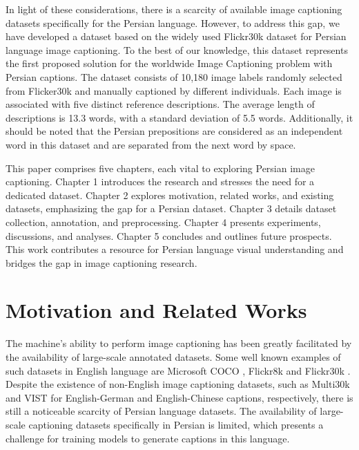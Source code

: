 \documentclass[runningheads]{llncs}
\begin{document}
In light of these considerations, there is a scarcity of available image captioning datasets specifically for the Persian language. However, to address this gap, we have developed a dataset based on the widely used Flickr30k dataset \cite{Flickr30k} for Persian language image captioning. To the best of our knowledge, this dataset represents the first proposed solution for the worldwide Image Captioning problem with Persian captions. The dataset consists of 10,180 image labels randomly selected from Flicker30k and manually captioned by different individuals. Each image is associated with five distinct reference descriptions. The average length of descriptions is 13.3 words, with a standard deviation of 5.5 words. Additionally, it should be noted that the Persian prepositions are considered as an independent word in this dataset and are separated from the next word by space.

This paper comprises five chapters, each vital to exploring Persian image captioning. Chapter 1 introduces the research and stresses the need for a dedicated dataset. Chapter 2 explores motivation, related works, and existing datasets, emphasizing the gap for a Persian dataset. Chapter 3 details dataset collection, annotation, and preprocessing. Chapter 4 presents experiments, discussions, and analyses. Chapter 5 concludes and outlines future prospects. This work contributes a resource for Persian language visual understanding and bridges the gap in image captioning research.

\section{Motivation and Related Works}
The machine's ability to perform image captioning has been greatly facilitated by the availability of large-scale annotated datasets. Some well known examples of such datasets in English language are Microsoft COCO \cite{MSCOCO}, Flickr8k \cite{Flickr8k} and Flickr30k \cite{Flickr30k}. Despite the existence of non-English image captioning datasets, such as Multi30k \cite{Multi30k} and VIST \cite{VIST} for English-German and English-Chinese captions, respectively, there is still a noticeable scarcity of Persian language datasets. The availability of large-scale captioning datasets specifically in Persian is limited, which presents a challenge for training models to generate captions in this language.
\end{document}
